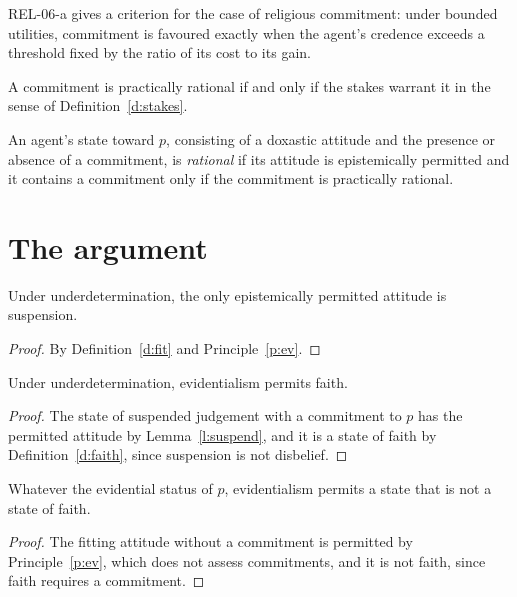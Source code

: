 \documentclass{situationist-preprint}
\begin{document}
REL-06-a gives a criterion for the case of religious commitment: under bounded utilities, commitment is favoured exactly when the agent's credence exceeds a threshold fixed by the ratio of its cost to its gain.

\begin{principle}\label{p:prac}
A commitment is practically rational if and only if the stakes warrant it in the sense of Definition~\ref{d:stakes}.
\end{principle}

\begin{definition}\label{d:rational}
An agent's state toward $p$, consisting of a doxastic attitude and the presence or absence of a commitment, is \emph{rational} if its attitude is epistemically permitted and it contains a commitment only if the commitment is practically rational.
\end{definition}

\section{The argument}

\begin{lemma}\label{l:suspend}
Under underdetermination, the only epistemically permitted attitude is suspension.
\end{lemma}

\begin{proof}
By Definition~\ref{d:fit} and Principle~\ref{p:ev}.
\end{proof}

\begin{proposition}\label{p:notforb}
Under underdetermination, evidentialism permits faith.
\end{proposition}

\begin{proof}
The state of suspended judgement with a commitment to $p$ has the permitted attitude by Lemma~\ref{l:suspend}, and it is a state of faith by Definition~\ref{d:faith}, since suspension is not disbelief.
\end{proof}

\begin{proposition}\label{p:notreq}
Whatever the evidential status of $p$, evidentialism permits a state that is not a state of faith.
\end{proposition}

\begin{proof}
The fitting attitude without a commitment is permitted by Principle~\ref{p:ev}, which does not assess commitments, and it is not faith, since faith requires a commitment.
\end{proof}
\end{document}
